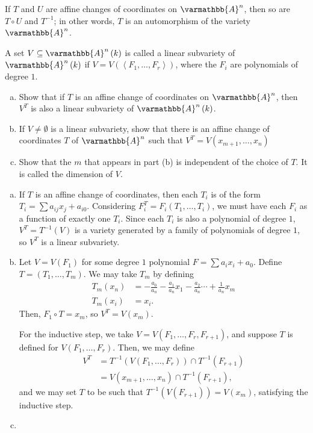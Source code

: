 \documentclass[10pt]{mypackage}
\renewcommand*{\mathbb}[1]{\varmathbb{#1}}
\newcommand{\A}{\mathbb{A}}
\begin{document}
If $T$ and $U$ are affine changes of coordinates on $\A^n$, then so are $T\circ U$ and $T^{-1}$; in other words, $T$ is an automorphism of the variety $\A^n$.
\begin{exercise}[Exercise 2.14]
A set $V\subseteq \A^n\left( k \right)$ is called a linear subvariety of $\A^n\left( k \right)$ if $V = V\left( \left\langle F_1,\dots,F_r \right\rangle \right)$, where the $F_i$ are polynomials of degree $1$.
\begin{enumerate}[(a)]
  \item Show that if $T$ is an affine change of coordinates on $\A^n$, then $V^T$ is also a linear subvariety of $\A^n\left( k \right)$.
  \item If $V\neq\emptyset$ is a linear subvariety, show that there is an affine change of coordinates $T$ of $\A^n$ such that $V^{T} = V\left( x_{m+1},\dots,x_n \right)$
  \item Show that the $m$ that appears in part (b) is independent of the choice of $T$. It is called the dimension of $V$.
\end{enumerate}
\end{exercise}
\begin{solution}\hfill
  \begin{enumerate}[(a)]
    \item If $T$ is an affine change of coordinates, then each $T_i$ is of the form $T_i = \sum a_{ij}x_j + a_{i0}$. Considering $F_i^T = F_i\left( T_1,\dots,T_i \right)$, we must have each $F_i$ as a function of exactly one $T_i$. Since each $T_i$ is also a polynomial of degree $1$, $V^T = T^{-1}\left( V \right)$ is a variety generated by a family of polynomials of degree $1$, so $V^T$ is a linear subvariety.
    \item Let $V = V\left(F_1\right)$ for some degree $1$ polynomial $F = \sum a_i x_i + a_0$. Define $T = \left( T_1,\dots,T_m \right)$. We may take $T_m$ by defining
      \begin{align*}
        T_m\left( x_n \right) &= - \frac{a_0}{a_n} -\frac{a_1}{a_n}x_1 - \frac{a_2}{a_n} \cdots + \frac{1}{a_n}x_m\\
        T_m\left( x_i \right) &= x_i.\tag*{$i\leq n-1$}
      \end{align*}
      Then, $F_1\circ T = x_m$, so $V^T = V\left( x_m \right)$.\newline

      For the inductive step, we take $V = V\left( F_1,\dots,F_r,F_{r+1} \right)$, and suppose $T$ is defined for $V\left( F_1,\dots, F_r \right)$. Then, we may define
      \begin{align*}
        V^T &= T^{-1}\left( V\left( F_1,\dots,F_r \right) \right)\cap T^{-1}\left( F_{r+1} \right)\\
            &= V\left( x_{m+1},\dots,x_n \right)\cap T^{-1}\left( F_{r+1} \right),
      \end{align*}
      and we may set $T$ to be such that $T^{-1}\left( V\left( F_{r+1} \right) \right) = V\left( x_m \right)$, satisfying the inductive step.
    \item 
  \end{enumerate}
\end{solution}
\end{document}
